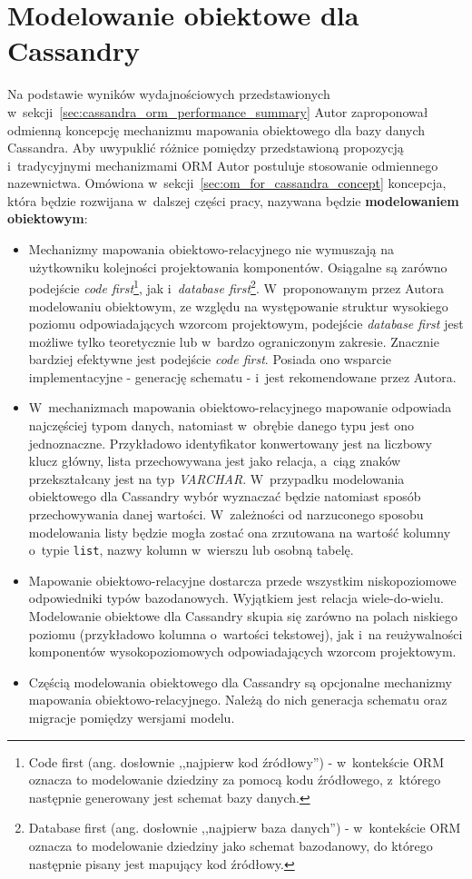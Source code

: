 
\chapter{Modelowanie obiektowe dla Cassandry}

Na podstawie wyników wydajnościowych przedstawionych w~sekcji~\ref{sec:cassandra_orm_performance_summary} Autor zaproponował odmienną koncepcję mechanizmu mapowania obiektowego dla bazy danych Cassandra. Aby uwypuklić różnice pomiędzy przedstawioną propozycją i~tradycyjnymi mechanizmami ORM Autor postuluje stosowanie odmiennego nazewnictwa. Omówiona w~sekcji~\ref{sec:om_for_cassandra_concept} koncepcja, która będzie rozwijana w~dalszej części pracy, nazywana będzie \textbf{modelowaniem obiektowym}:

\begin{itemize}
	\item Mechanizmy mapowania obiektowo-relacyjnego nie wymuszają na użytkowniku kolejności projektowania komponentów. Osiągalne są zarówno podejście \emph{code first}\footnote{Code first (ang. dosłownie ,,najpierw kod źródłowy'') - w~kontekście ORM oznacza to modelowanie dziedziny za pomocą kodu źródłowego, z~którego następnie generowany jest schemat bazy danych.}, jak i~\emph{database first}\footnote{Database first (ang. dosłownie ,,najpierw baza danych'') - w~kontekście ORM oznacza to modelowanie dziedziny jako schemat bazodanowy, do którego następnie pisany jest mapujący kod źródłowy.}. W~proponowanym przez Autora modelowaniu obiektowym, ze względu na występowanie struktur wysokiego poziomu odpowiadających wzorcom projektowym, podejście \emph{database first} jest możliwe tylko teoretycznie lub w~bardzo ograniczonym zakresie. Znacznie bardziej efektywne jest podejście \emph{code first}. Posiada ono wsparcie implementacyjne - generację schematu - i~jest rekomendowane przez Autora.
	\item W~mechanizmach mapowania obiektowo-relacyjnego mapowanie odpowiada najczęściej typom danych, natomiast w~obrębie danego typu jest ono jednoznaczne. Przykładowo identyfikator konwertowany jest na liczbowy klucz główny, lista przechowywana jest jako relacja, a~ciąg znaków przekształcany jest na typ \emph{VARCHAR}. W~przypadku modelowania obiektowego dla Cassandry wybór wyznaczać będzie natomiast sposób przechowywania danej wartości. W~zależności od narzuconego sposobu modelowania listy będzie mogła zostać ona zrzutowana na wartość kolumny o~typie \verb+list+, nazwy kolumn w~wierszu lub osobną tabelę.
	\item Mapowanie obiektowo-relacyjne dostarcza przede wszystkim niskopoziomowe odpowiedniki typów bazodanowych. Wyjątkiem jest relacja wiele-do-wielu. Modelowanie obiektowe dla Cassandry skupia się zarówno na polach niskiego poziomu (przykładowo kolumna o~wartości tekstowej), jak i~na reużywalności komponentów wysokopoziomowych odpowiadających wzorcom projektowym.
	\item Częścią modelowania obiektowego dla Cassandry są opcjonalne mechanizmy mapowania obiektowo-relacyjnego. Należą do nich generacja schematu oraz migracje pomiędzy wersjami modelu.
\end{itemize}

